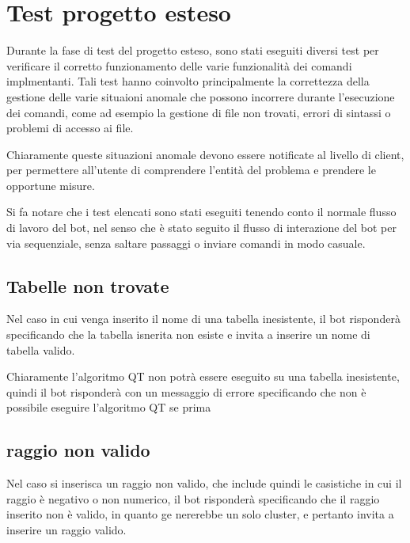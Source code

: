 \section{Test progetto esteso}

Durante la fase di test del progetto esteso, sono stati eseguiti diversi test per verificare il corretto funzionamento delle varie funzionalità dei comandi implmentanti. 
Tali test hanno coinvolto principalmente la correttezza della gestione delle varie situaioni anomale che possono incorrere durante l'esecuzione dei comandi, come ad esempio la gestione di file non trovati, errori di sintassi o problemi di accesso ai file.

Chiaramente queste situazioni anomale devono essere notificate al livello di client, per permettere all'utente di comprendere l'entità del problema e prendere le opportune misure.

Si fa notare che i test elencati sono stati eseguiti tenendo conto il normale flusso di lavoro del bot, nel senso che è stato seguito il flusso di interazione del bot per via sequenziale, senza saltare passaggi o inviare comandi in modo casuale.

\subsection{Tabelle non trovate}

Nel caso in cui venga inserito il nome di una tabella inesistente, il bot risponderà specificando che  la tabella isnerita non esiste e invita a inserire un nome di tabella valido.


Chiaramente l'algoritmo QT non potrà essere eseguito su una tabella inesistente, quindi il bot risponderà con un messaggio di errore specificando che non è possibile eseguire l'algoritmo QT se prima 


\subsection{raggio non valido}

Nel caso si inserisca un raggio non valido, che include quindi le casistiche in cui il raggio è negativo o non numerico, il bot risponderà specificando che il raggio inserito non è valido, in quanto ge nererebbe un solo cluster, e pertanto  invita a inserire un raggio valido.

